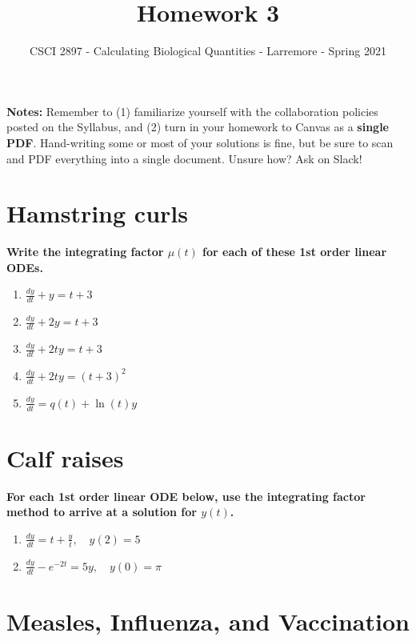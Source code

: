 \documentclass[11pt,onecolumn,superscriptaddress,notitlepage]{article}
\date{}
\newcommand{\dy}[0]{\displaystyle\frac{dy}{dt}}
\begin{document}
\author{CSCI 2897 - Calculating Biological Quantities - Larremore - Spring 2021}
\title{Homework 3}
\maketitle

{\bf Notes:} Remember to (1) familiarize yourself with the collaboration policies posted on the Syllabus, and (2) turn in your homework to Canvas as a {\bf single PDF}. Hand-writing some or most of your solutions is fine, but be sure to scan and PDF everything into a single document. Unsure how? Ask on Slack! 

\section*{Hamstring curls}

{\bf Write the integrating factor $\mu(t)$ for each of these 1st order linear ODEs.} 

\begin{enumerate}
	\item $\dy + y = t+3$
	\item $\dy + 2y = t+3$
	\item $\dy + 2ty = t+3$
	\item $\dy + 2ty = (t+3)^2$
	\item $\dy = q(t) + \ln(t)y$
\end{enumerate}

\section*{Calf raises} 

{\bf For each 1st order linear ODE below, use the integrating factor method to arrive at a solution for $y(t)$.}

\begin{enumerate}[resume]
	\item $\dy = t + \frac{y}{t}, \quad y(2) = 5$
	\item $\dy - e^{-2t} = 5y, \quad y(0) = \pi$
\end{enumerate}

\clearpage
\section*{Measles, Influenza, and Vaccination} 
\end{document}
